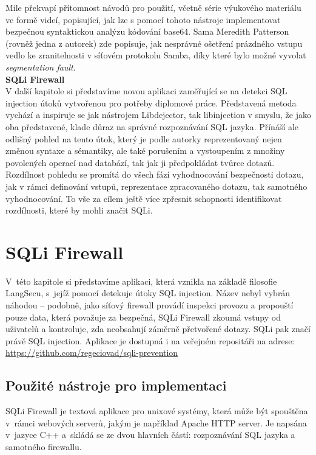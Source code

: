 Mile překvapí přítomnost návodů pro použití, včetně série výukového materiálu ve formě videí, popisující, jak lze s pomocí tohoto nástroje implementovat 
bezpečnou syntaktickou analýzu kódování base64. Sama Meredith Patterson (rovněž jedna z autorek) zde popisuje, jak nesprávné ošetření prázdného vstupu 
vedlo ke zranitelnosti v síťovém protokolu Samba, díky které bylo možné vyvolat \textit{segmentation fault}. \\
\newpage
\Bat{} \textbf{SQLi Firewall} \\
V další kapitole si představíme novou aplikaci zaměřující se na detekci SQL injection útoků vytvořenou pro potřeby diplomové práce. 
Představená metoda vychází a inspiruje se jak nástrojem Libdejector, tak libinjection v smyslu, že jako oba představené, klade důraz na správné
rozpoznávání SQL jazyka. Přínáší ale odlišný pohled na tento útok, který je podle autorky reprezentovaný nejen změnou syntaxe a sémantiky, ale
také porušením a vystoupením z množiny povolených operací nad databází, tak jak ji předpokládat tvůrce dotazů. Rozdílnost pohledu se promítá
do všech fází vyhodnocování bezpečnosti dotazu, jak v rámci definování vstupů, reprezentace zpracovaného dotazu, tak samotného vyhodnocování.
To vše za cílem ještě více zpřesnit schopnosti identifikovat rozdílnosti, které by mohli značit SQLi.


\chapter{SQLi Firewall} \label{ch:sqlifirewall}
V~této kapitole si představíme aplikaci, která vznikla na základě filosofie LangSecu, s~jejíž pomocí 
detekuje útoky SQL injection. Název nebyl vybrán náhodou -- podobně, jako síťový firewall provádí inspekci provozu a propouští pouze data, která 
považuje za bezpečná, SQLi Firewall zkoumá vstupy od uživatelů a kontroluje, zda neobsahují záměrně přetvořené dotazy. SQLi pak značí právě
SQL injection. Aplikace je dostupná i na veřejném repositáři na adrese: \url{https://github.com/regeciovad/sqli-prevention}

\section{Použité nástroje pro implementaci} \label{sec:6:nastroje}
SQLi Firewall je textová aplikace pro unixové systémy, která může být spouštěna v~rámci webových serverů, jakým je například Apache HTTP server.
Je napsána v~jazyce C++ a~skládá se ze dvou hlavních částí: rozpoznávání SQL jazyka a samotného firewallu. \\

